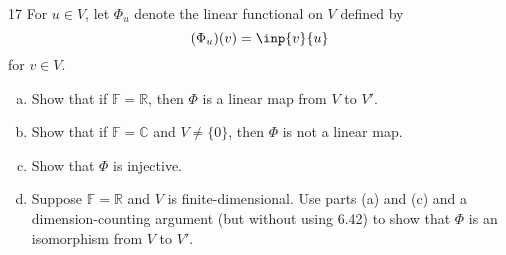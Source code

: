 \documentclass{extarticle}
\newenvironment{problem}[1]{\begin{prob*}{#1}{}}{\end{prob*}}
\newcommand{\R}{\mathbb{R}}
\newcommand{\C}{\mathbb{C}}
\newcommand{\F}{\mathbb{F}}
\begin{document}
\begin{problem}{17}
For $u\in V$, let $\Phi_u$ denote the linear functional on $V$ defined by
\begin{equation*}
(\Phi_u)(v) = \inp{v}{u}
\end{equation*}
for $v \in V$.
\begin{enumerate}[(a)]
\item Show that if $\F = \R$, then $\Phi$ is a linear map from $V$ to $V'$.
\item Show that if $\F = \C$ and $V\neq \{0\}$, then $\Phi$ is not a linear map.
\item Show that $\Phi$ is injective.
\item Suppose $\F = \R$ and $V$ is finite-dimensional.  Use parts (a) and (c) and a dimension-counting argument (but without using 6.42) to show that $\Phi$ is an isomorphism from $V$ to $V'$.
\end{enumerate}
\end{problem}
\end{document}
